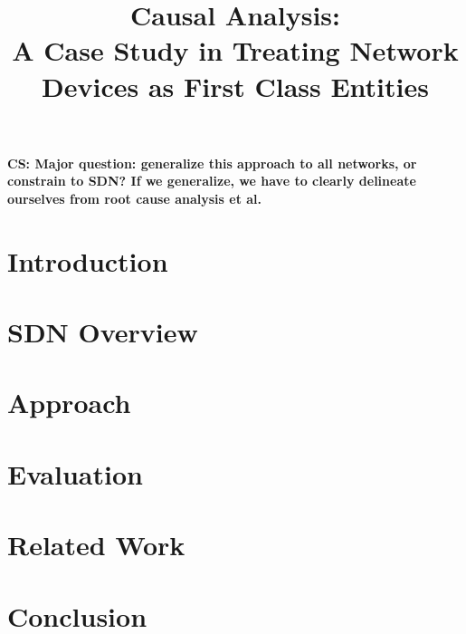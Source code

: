 \documentclass{sig-alternate-10pt}
\title{Causal Analysis: \\ A Case Study in Treating Network Devices as First Class Entities}
\newcommand{\colin}[1]{{\color{red}\bf CS: {#1}}}
\begin{document}
    \maketitle

\abstract{{\it }}

\colin{Major question: generalize this approach to all networks, or constrain
       to SDN? If we generalize, we have to clearly delineate ourselves from
       root cause analysis et al.}

\section{Introduction}
\label{sec:intro}


\section{SDN Overview}
\label{sec:overview}


\section{Approach}
\label{sec:approach}


\section{Evaluation}
\label{sec:evaluation}


\section{Related Work}
\label{sec:related_work}


\section{Conclusion}
\label{sec:conclusion}


 \small 

%
\end{document}
